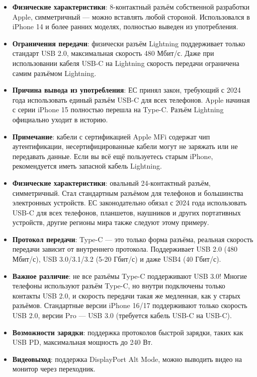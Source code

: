 \begin{itemize}
  \item \textbf{Физические характеристики}: 8-контактный разъём собственной разработки Apple, симметричный — можно вставлять любой стороной. Использовался в iPhone 14 и более ранних моделях, полностью выведен из употребления.
  \item \textbf{Ограничения передачи}: физически разъём Lightning поддерживает только стандарт USB 2.0, максимальная скорость 480 Мбит/с. Даже при использовании кабеля USB-C на Lightning скорость передачи ограничена самим разъёмом Lightning.
  \item \textbf{Причина вывода из употребления}: ЕС принял закон, требующий с 2024 года использовать единый разъём USB-C для всех телефонов. Apple начиная с серии iPhone 15 полностью перешла на Type-C. Разъём Lightning официально уходит в историю.
  \item \textbf{Примечание}: кабели с сертификацией Apple MFi содержат чип аутентификации, несертифицированные кабели могут не заряжать или не передавать данные. Если вы всё ещё пользуетесь старым iPhone, рекомендуется иметь запасной кабель Lightning.
\end{itemize}


\begin{itemize}
  \item \textbf{Физические характеристики}: овальный 24-контактный разъём, симметричный. Стал стандартным разъёмом для телефонов и большинства электронных устройств. ЕС законодательно обязал с 2024 года использовать USB-C для всех телефонов, планшетов, наушников и других портативных устройств, другие регионы мира также следуют этому примеру.
  \item \textbf{Протокол передачи}: Type-C — это только форма разъёма, реальная скорость передачи зависит от внутреннего протокола. Поддерживает USB 2.0 (480 Мбит/с), USB 3.0/3.1/3.2 (5-20 Гбит/с) и даже USB4 (40 Гбит/с).
  \item \textbf{Важное различие}: не все разъёмы Type-C поддерживают USB 3.0! Многие телефоны используют разъём Type-C, но внутри подключены только контакты USB 2.0, и скорость передачи такая же медленная, как у старых разъёмов. Стандартные версии iPhone 16/17 поддерживают только скорость USB 2.0, версии Pro — USB 3.0 (требуется кабель USB-C на USB-C).
  \item \textbf{Возможности зарядки}: поддержка протоколов быстрой зарядки, таких как USB PD, максимальная мощность до 240 Вт.
  \item \textbf{Видеовыход}: поддержка DisplayPort Alt Mode, можно выводить видео на монитор через переходник.
\end{itemize}

